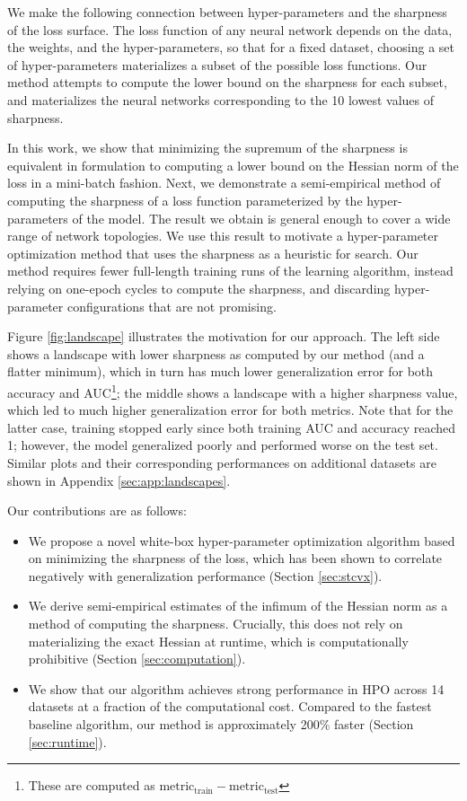 \documentclass[preprint,12pt]{elsarticle}
\begin{document}
We make the following connection between hyper-parameters and the sharpness of the loss surface. The loss function of any neural network depends on the data, the weights, and the hyper-parameters, so that for a fixed dataset, choosing a set of hyper-parameters materializes a subset of the possible loss functions. Our method attempts to compute the lower bound on the sharpness for each subset, and materializes the neural networks corresponding to the 10 lowest values of sharpness.

In this work, we show that minimizing the supremum of the sharpness is equivalent in formulation to computing a lower bound on the Hessian norm of the loss in a mini-batch fashion. Next, we demonstrate a semi-empirical method of computing the sharpness of a loss function parameterized by the hyper-parameters of the model. The result we obtain is general enough to cover a wide range of network topologies. We use this result to motivate a hyper-parameter optimization method that uses the sharpness as a heuristic for search. Our method requires fewer full-length training runs of the learning algorithm, instead relying on one-epoch cycles to compute the sharpness, and discarding hyper-parameter configurations that are not promising. 

Figure \ref{fig:landscape} illustrates the motivation for our approach. The left side shows a landscape with lower sharpness as computed by our method (and a flatter minimum), which in turn has much lower generalization error for both accuracy and AUC\footnote{These are computed as $\text{metric}_{\text{train}} - \text{metric}_{\text{test}}$}; the middle shows a landscape with a higher sharpness value, which led to much higher generalization error for both metrics. Note that for the latter case, training stopped early since both training AUC and accuracy reached 1; however, the model generalized poorly and performed worse on the test set. Similar plots and their corresponding performances on additional datasets are shown in Appendix \ref{sec:app:landscapes}.

Our contributions are as follows:
\begin{itemize}
    \item We propose a novel white-box hyper-parameter optimization algorithm based on minimizing the sharpness of the loss, which has been shown to correlate negatively with generalization performance (Section \ref{sec:stcvx}).
    \item We derive semi-empirical estimates of the infimum of the Hessian norm as a method of computing the sharpness. Crucially, this does not rely on materializing the exact Hessian at runtime, which is computationally prohibitive (Section \ref{sec:computation}).
    \item We show that our algorithm achieves strong performance in HPO across 14 datasets at a fraction of the computational cost. Compared to the fastest baseline algorithm, our method is approximately 200\% faster (Section \ref{sec:runtime}).
\end{itemize}
\end{document}

